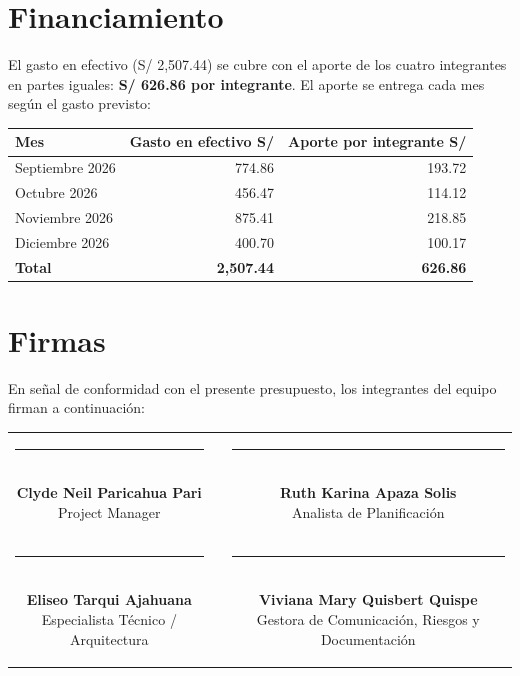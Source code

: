 \documentclass[11pt,a4paper]{article}
\begin{document}
\section{Financiamiento}
El gasto en efectivo (S/ 2,507.44) se cubre con el aporte de los cuatro integrantes en partes iguales: \textbf{S/ 626.86 por integrante}. El aporte se entrega cada mes según el gasto previsto:

\vspace{0.1cm}
{\small
{}
\noindent\begin{tabularx}{\textwidth}{@{}L R R@{}}
\toprule
{}
\textbf{Mes} & \textbf{Gasto en efectivo S/} & \textbf{Aporte por integrante S/} \\
\midrule
Septiembre 2026 & 774.86 & 193.72 \\
Octubre 2026 & 456.47 & 114.12 \\
Noviembre 2026 & 875.41 & 218.85 \\
Diciembre 2026 & 400.70 & 100.17 \\
\midrule
{}\textbf{Total} & \textbf{2,507.44} & \textbf{626.86} \\
\bottomrule
\end{tabularx}
}

\section{Firmas}
\noindent En señal de conformidad con el presente presupuesto, los integrantes del equipo firman a continuación:

\vspace{1.5cm}
\begin{center}
\begin{tabular}{c c c}
    \parbox{6.5cm}{\centering \rule{6.0cm}{0.6pt}\\[5pt] \textbf{Clyde Neil Paricahua Pari}\\[2pt] {\footnotesize Project Manager}}
    & \hspace{0.8cm} &
    \parbox{6.5cm}{\centering \rule{6.0cm}{0.6pt}\\[5pt] \textbf{Ruth Karina Apaza Solis}\\[2pt] {\footnotesize Analista de Planificación}}
    \\[2.0cm]
    \parbox{6.5cm}{\centering \rule{6.0cm}{0.6pt}\\[5pt] \textbf{Eliseo Tarqui Ajahuana}\\[2pt] {\footnotesize Especialista Técnico / Arquitectura}}
    & \hspace{0.8cm} &
    \parbox{6.5cm}{\centering \rule{6.0cm}{0.6pt}\\[5pt] \textbf{Viviana Mary Quisbert Quispe}\\[2pt] {\footnotesize Gestora de Comunicación, Riesgos y Documentación}}
\end{tabular}
\end{center}
\end{document}
